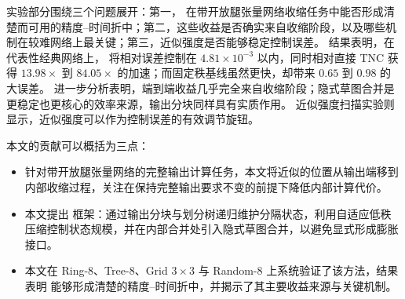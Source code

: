 实验部分围绕三个问题展开：第一，\ours{} 在带开放腿张量网络收缩任务中能否形成清楚而可用的精度--时间折中；第二，这些收益是否确实来自收缩阶段，以及哪些机制在较难网络上最关键；第三，近似强度是否能够稳定控制误差。
结果表明，在代表性经典网络上，\ours{} 将相对误差控制在 $4.81\times 10^{-3}$ 以内，同时相对直接 TNC 获得 $13.98\times$ 到 $84.05\times$ 的加速；而固定秩基线虽然更快，却带来 $0.65$ 到 $0.98$ 的大误差。
进一步分析表明，端到端收益几乎完全来自收缩阶段；隐式草图合并是更稳定也更核心的效率来源，输出分块同样具有实质作用。
近似强度扫描实验则显示，近似强度可以作为控制误差的有效调节旋钮。

本文的贡献可以概括为三点：
\begin{itemize}
    \item 针对带开放腿张量网络的完整输出计算任务，本文将近似的位置从输出端移到内部收缩过程，关注在保持完整输出要求不变的前提下降低内部计算代价。
    \item 本文提出 \ours{} 框架：通过输出分块与划分树递归维护分隔状态，利用自适应低秩压缩控制状态规模，并在内部合并处引入隐式草图合并，以避免显式形成膨胀接口。
    \item 本文在 Ring-8、Tree-8、Grid $3\times 3$ 与 Random-8 上系统验证了该方法，结果表明 \ours{} 能够形成清楚的精度--时间折中，并揭示了其主要收益来源与关键机制。
\end{itemize}